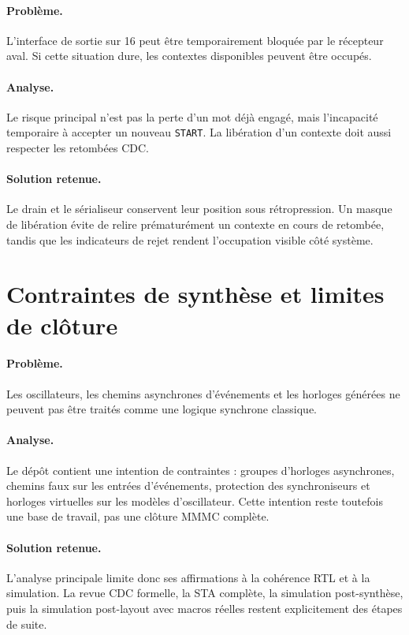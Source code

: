 \paragraph{Problème.}
L'interface de sortie sur \SI{16}{\bit} peut être temporairement bloquée par le récepteur aval. Si cette situation dure, les contextes disponibles peuvent être occupés.

\paragraph{Analyse.}
Le risque principal n'est pas la perte d'un mot déjà engagé, mais l'incapacité temporaire à accepter un nouveau \texttt{START}. La libération d'un contexte doit aussi respecter les retombées CDC.

\paragraph{Solution retenue.}
Le drain et le sérialiseur conservent leur position sous rétropression. Un masque de libération évite de relire prématurément un contexte en cours de retombée, tandis que les indicateurs de rejet rendent l'occupation visible côté système.

\section{Contraintes de synthèse et limites de clôture}

\paragraph{Problème.}
Les oscillateurs, les chemins asynchrones d'événements et les horloges générées ne peuvent pas être traités comme une logique synchrone classique.

\paragraph{Analyse.}
Le dépôt contient une intention de contraintes : groupes d'horloges asynchrones, chemins faux sur les entrées d'événements, protection des synchroniseurs et horloges virtuelles sur les modèles d'oscillateur. Cette intention reste toutefois une base de travail, pas une clôture MMMC complète.

\paragraph{Solution retenue.}
L'analyse principale limite donc ses affirmations à la cohérence RTL et à la simulation. La revue CDC formelle, la STA complète, la simulation post-synthèse, puis la simulation post-layout avec macros réelles restent explicitement des étapes de suite.

\clearpage
